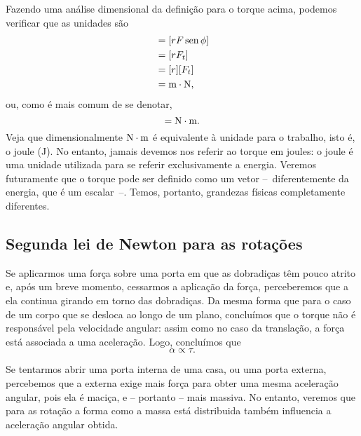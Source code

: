 Fazendo uma análise dimensional da definição para o torque acima, podemos verificar que as unidades são
\begin{align}
    [\tau] &= [r F \sen\phi] \\
    &= [r F_t] \\
    &= [r] [F_t] \\
    &= \rm{m} \cdot \rm{N},
\end{align}
%
ou, como é mais comum de se denotar,
\begin{equation}
    [\tau] = \rm{N}\cdot\rm{m}.
\end{equation}
%
Veja que dimensionalmente $\rm{N}\cdot\rm{m}$ é equivalente à unidade para o trabalho, isto é, o joule (J). No entanto, jamais devemos nos referir ao torque em joules: o joule é uma unidade utilizada para se referir exclusivamente a energia. Veremos futuramente que o torque pode ser definido como um vetor --~diferentemente da energia, que é um escalar~--. Temos, portanto, grandezas físicas completamente diferentes.

\subsection{Segunda lei de Newton para as rotações}

Se aplicarmos uma força sobre uma porta em que as dobradiças têm pouco atrito e, após um breve momento, cessarmos a aplicação da força, perceberemos que a ela continua girando em torno das dobradiças. Da mesma forma que para o caso de um corpo que se desloca ao longo de um plano, concluímos que o torque não é responsável pela velocidade angular: assim como no caso da translação, a força está associada a uma aceleração. Logo, concluímos que
\begin{equation}
	\alpha \propto \tau.
\end{equation}

Se tentarmos abrir uma porta interna de uma casa, ou uma porta externa, percebemos que a externa exige mais força para obter uma mesma aceleração angular, pois ela é maciça, e -- portanto -- mais massiva. No entanto, veremos que para as rotação a forma como a massa está distribuida também influencia a aceleração angular obtida.

